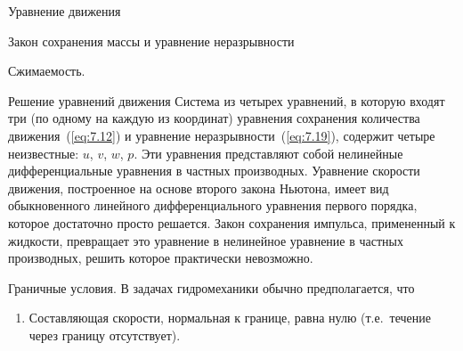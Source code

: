 \begin{chapter}{Уравнение движения}
\begin{section}{Закон сохранения массы и уравнение неразрывности}
\begin{paragraph}{Сжимаемость.}
\end{paragraph}
\end{section}

\begin{section}{Решение уравнений движения}
Система из четырех уравнений, в которую входят три (по одному на каждую из 
координат) уравнения сохранения количества движения~(\ref{eq:7.12}) 
и уравнение неразрывности~(\ref{eq:7.19}), содержит четыре неизвестные: 
$u$, $v$, $w$, $p$. Эти уравнения представляют собой нелинейные 
дифференциальные уравнения в частных производных. Уравнение скорости движения,
построенное на основе второго закона Ньютона, имеет вид обыкновенного линейного 
дифференциального уравнения первого порядка, которое достаточно просто решается.
Закон сохранения импульса, примененный к жидкости, превращает это уравнение
в нелинейное уравнение в частных производных, решить которое практически
невозможно.
%

\begin{paragraph}{Граничные условия.}
В задачах гидромеханики обычно предполагается, что
\begin{enumerate}
\item
Составляющая скорости, нормальная к границе, равна нулю (т.е.\ течение
через границу отсутствует).
%


\end{enumerate}
\end{paragraph}
\end{section}
\end{chapter}
